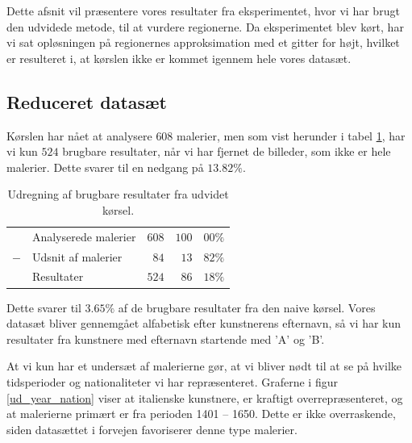 {
{\sffamily Dette afsnit vil præsentere vores resultater fra
eksperimentet, hvor vi har brugt den udvidede metode, til at vurdere
regionerne. Da eksperimentet blev kørt, har vi sat opløsningen på
regionernes approksimation med et gitter for højt, hvilket er resulteret
i, at kørslen ikke er kommet igennem hele vores datasæt.
}

\subsection{Reduceret datasæt}
Kørslen har nået at analysere $608$ malerier, men som vist herunder i
tabel \ref{ud_tabel_fjern_detaljer}, har vi kun $524$ brugbare
resultater, når vi har fjernet de billeder, som ikke er hele malerier.
Dette svarer til en nedgang på $13.82\%$.

\begin{table}[H]
    \centering
    \begin{tabular}{r@{\ \ }p{12em}r|r@{.}l}
            & Analyserede malerier & $608$ & $100$ & $00\%$   \\
        $-$ & Udsnit af malerier   &  $84$ &  $13$ & $82\%$   \\\hline
            & Resultater           & $524$ &  $86$ & $18\%$
    \end{tabular}
    \caption[]{Udregning af brugbare resultater fra udvidet kørsel.}
    \label{ud_tabel_fjern_detaljer}
\end{table}

Dette svarer til $3.65\%$ af de brugbare resultater fra den
naive kørsel. Vores datasæt bliver gennemgået alfabetisk efter
kunstnerens efternavn, så vi har kun resultater fra kunstnere med
efternavn startende med 'A' og 'B'.

At vi kun har et undersæt af malerierne gør, at vi bliver nødt til at se
på hvilke tidsperioder og nationaliteter vi har repræsenteret. Graferne
i figur \ref{ud_year_nation} viser at italienske kunstnere, er kraftigt
overrepræsenteret, og at malerierne primært er fra perioden 1401 --
1650. Dette er ikke overraskende, siden datasættet i forvejen
favoriserer denne type malerier.

}
